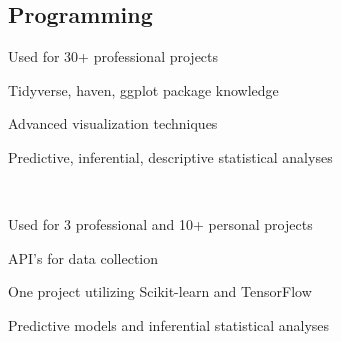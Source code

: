 \subsection{Programming}
    \begin{cvtable}
        {\begin{tightitemize}
            \item Used for 30+ professional projects 
            \item Tidyverse, haven, ggplot package knowledge
            \item Advanced visualization techniques
            \item Predictive, inferential, descriptive statistical analyses
        \end{tightitemize}}
        \\[4pt]
        {\begin{tightitemize}
            \item Used for 3 professional and 10+ personal projects 
            \item API's for data collection
            \item One project utilizing Scikit-learn and TensorFlow
            \item Predictive models and inferential statistical analyses 
        \end{tightitemize}}
        \\[4pt]
    \end{cvtable}
